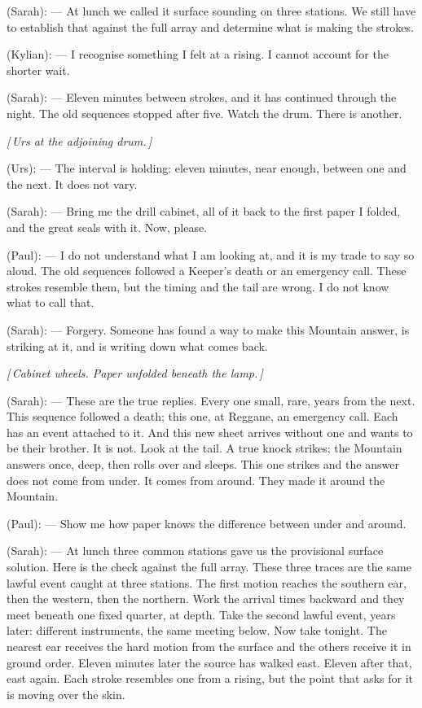 
\begin{room}

(Sarah): --- At lunch we called it surface sounding on three stations. We still have to establish that against the full array and determine what is making the strokes.

(Kylian): --- I recognise something I felt at a rising. I cannot account for the shorter wait.

(Sarah): --- Eleven minutes between strokes, and it has continued through the night. The old sequences stopped after five. Watch the drum. There is another.

\centerline{\textit{[\,Urs at the adjoining drum.\,]}}

(Urs): --- The interval is holding: eleven minutes, near enough, between one and the next. It does not vary.

(Sarah): --- Bring me the drill cabinet, all of it back to the first paper I folded, and the great seals with it. Now, please.

(Paul): --- I do not understand what I am looking at, and it is my trade to say so aloud. The old sequences followed a Keeper's death or an emergency call. These strokes resemble them, but the timing and the tail are wrong. I do not know what to call that.

(Sarah): --- Forgery. Someone has found a way to make this Mountain answer, is striking at it, and is writing down what comes back.

\centerline{\textit{[\,Cabinet wheels. Paper unfolded beneath the lamp.\,]}}

(Sarah): --- These are the true replies. Every one small, rare, years from the next. This sequence followed a death; this one, at Reggane, an emergency call. Each has an event attached to it. And this new sheet arrives without one and wants to be their brother. It is not. Look at the tail. A true knock strikes; the Mountain answers once, deep, then rolls over and sleeps. This one strikes and the answer does not come from under. It comes from around. They made it around the Mountain.

(Paul): --- Show me how paper knows the difference between under and around.

(Sarah): --- At lunch three common stations gave us the provisional surface solution. Here is the check against the full array. These three traces are the same lawful event caught at three stations. The first motion reaches the southern ear, then the western, then the northern. Work the arrival times backward and they meet beneath one fixed quarter, at depth. Take the second lawful event, years later: different instruments, the same meeting below. Now take tonight. The nearest ear receives the hard motion from the surface and the others receive it in ground order. Eleven minutes later the source has walked east. Eleven after that, east again. Each stroke resembles one from a rising, but the point that asks for it is moving over the skin.


\end{room}
